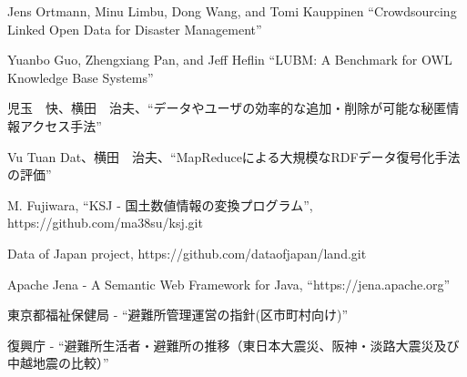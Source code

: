 ﻿%
\begin{thebibliography}{9}%
Jens Ortmann, Minu Limbu, Dong Wang, and Tomi Kauppinen ``Crowdsourcing Linked
Open Data for Disaster Management''

Yuanbo Guo, Zhengxiang Pan, and Jeff Heflin ``LUBM: A Benchmark for OWL
Knowledge Base Systems''

児玉　快、横田　治夫、``データやユーザの効率的な追加・削除が可能な秘匿情報アクセス手法''

Vu Tuan Dat、横田　治夫、``MapReduceによる大規模なRDFデータ復号化手法の評価'' 

M. Fujiwara, ``KSJ - 国土数値情報の変換プログラム'', https://github.com/ma38su/ksj.git

Data of Japan project, https://github.com/dataofjapan/land.git

Apache Jena - A Semantic Web Framework for Java, ``https://jena.apache.org''

東京都福祉保健局 - ``避難所管理運営の指針(区市町村向け)''

復興庁 - ``避難所生活者・避難所の推移（東日本大震災、阪神・淡路大震災及び中越地震の比較）''

\end{thebibliography}
